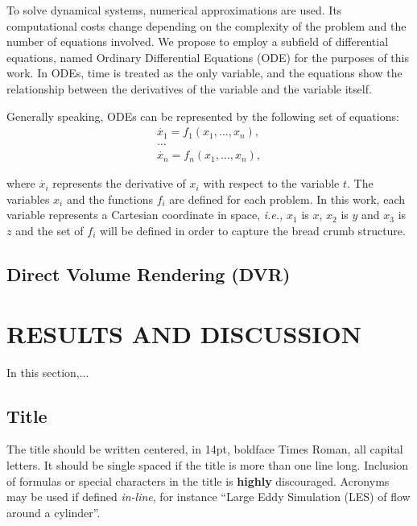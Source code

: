 \documentclass[oneside,a4paper,english,links]{amca}
\begin{document}
To solve dynamical systems, numerical approximations are used. Its computational costs change depending on the complexity of the problem and the number of equations involved. We propose to employ a subfield of differential equations, named Ordinary Differential Equations (ODE) for the purposes of this work. In ODEs, time is treated as the only variable, and the equations show the relationship between the derivatives of the variable and the variable itself. 

Generally speaking, ODEs can be represented by the following set of equations:
\begin{equation} \label{eq:simple}  
\begin{aligned}
\dot{x_{1}} = f_{1}(x_{1},\ldots,x_{n}),\\
\ldots\\
\dot{x_{n}} = f_{n}(x_{1},\ldots,x_{n}),
\end{aligned}
\end{equation}

where $\dot{x_{i}}$ represents the derivative of $x_{i}$ with respect to the variable $t$. The variables $x_{i}$ and the functions $f_{i}$ are defined for each problem. In this work, each variable represents a Cartesian coordinate in space, {\em i.e.,} $x_{1}$ is $x$, $x_{2}$ is $y$ and $x_{3}$ is $z$ and the set of $f_{i}$ will be defined in order to capture the bread crumb structure.


\subsection{Direct Volume Rendering (DVR)}

\section{RESULTS AND DISCUSSION}

In this section,...



\subsection{Title}

The title should be written centered, in 14pt, boldface Times Roman,
all capital letters. It should be single spaced if the title is more
than one line long. Inclusion of formulas or special characters in the
title is \textbf{highly} discouraged. Acronyms may be used if defined
\emph{in-line}, for instance ``Large Eddy Simulation (LES) of
flow around a cylinder''.
\end{document}
